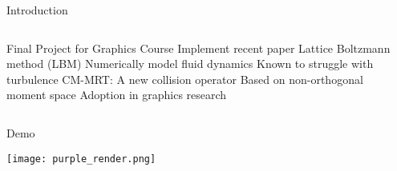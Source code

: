 \placelogofalse
\begin{frame}{Introduction}
\begin{columns}
\centering
\begin{outline}
  \1 Final Project for Graphics Course
  \2 Implement recent paper \cite{Li2020, Lyu2021}
  \1 Lattice Boltzmann method (LBM) 
  \2 Numerically model fluid dynamics
  \2 Known to struggle with turbulence
  \1 CM-MRT: A new collision operator
  \2 Based on non-orthogonal moment space \cite{De2019}
  \2 Adoption in graphics research \cite{Li2018, Li2020, Li2024, Lyu2021}
\end{outline}

\begin{center}
\centering
{}

\end{center}
\end{columns}
\end{frame}
\placelogotrue

\placelogofalse
\begin{frame}{Demo}
  \begin{center}
  \centering
  \texttt{[image: purple\_render.png]}
  \end{center}
\end{frame}
\placelogotrue
